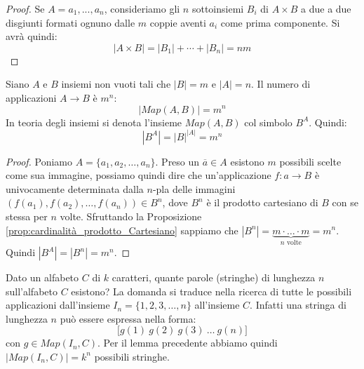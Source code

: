 \begin{proof}
	Se $A={a_{1},...,a_{n}}$, consideriamo gli $n$ sottoinsiemi $B_{i}$ di $A \times B$ a due a due disgiunti formati ognuno dalle $m$ coppie aventi $a_{i}$ come prima componente. Si avrà quindi:
	\begin{displaymath}
		|A \times B| = |B_{1}|+\cdots + |B_{n}|=nm
	\end{displaymath}
\end{proof}


\begin{lemmabox}
	Siano $A$ e $B$ insiemi non vuoti tali che $|B|=m$ e $|A|=n$. Il numero di applicazioni $A \longrightarrow B$ è $m^{n}$:
	\begin{equation}\label{eq:mapab}
		|Map(A,B)| = m^{n}
	\end{equation}
	In teoria degli insiemi si denota l'insieme $Map(A,B)$ col simbolo $B^{A}$. Quindi:
	\begin{equation}
		|B^{A}|=|B|^{|A|}=m^{n}
	\end{equation}
\end{lemmabox}
\begin{proof}
	Poniamo $A=\{a_{1},a_{2},\ldots,a_{n}\}$. Preso un $\overline{a} \in A$ esistono $m$ possibili scelte come sua immagine, possiamo quindi dire che un'applicazione $f: a \rightarrow B$  è univocamente determinata dalla $n$-pla delle immagini $(f(a_{1}),f(a_{2}),\ldots,f(a_{n})) \in B^{n}$, dove $B^{n}$ è il prodotto cartesiano di $B$ con se stessa per $n$ volte.  Sfruttando la Proposizione \ref{prop:cardinalità_prodotto_Cartesiano} sappiamo che $|B^{n}| = \underbrace{m \cdot \ldots \cdot  m}_{\text{$n$ volte}} = m^{n}$. Quindi $|B^{A}| = |B^{n}| =  m^{n}$.
\end{proof}
\begin{example}
	Dato un alfabeto $C$ di $k$ caratteri, quante parole (stringhe) di lunghezza $n$ sull'alfabeto $C$ esistono? La domanda si traduce nella ricerca di tutte le possibili applicazioni dall'insieme $I_{n} = \{1,2,3,\ldots,n\}$ all'insieme $C$. Infatti una stringa di lunghezza $n$ può essere espressa nella forma:
	\[
	\bigl[g(1) \ g(2) \ g(3) \ \ldots \ g(n) \bigr]
	\]
	con $g \in Map(I_{n},C)$. Per il lemma precedente abbiamo quindi $|Map(I_{n},C)| = k^{n}$ possibili stringhe.
\end{example}
